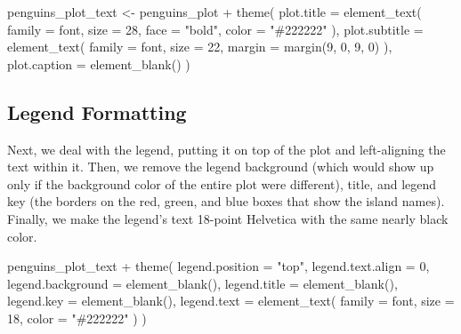 \documentclass[
]{book}
\newenvironment{Shaded}{\begin{snugshade}}{\end{snugshade}}
\newcommand{\AttributeTok}[1]{\textcolor[rgb]{0.77,0.63,0.00}{#1}}
\newcommand{\DecValTok}[1]{\textcolor[rgb]{0.00,0.00,0.81}{#1}}
\newcommand{\FunctionTok}[1]{\textcolor[rgb]{0.00,0.00,0.00}{#1}}
\newcommand{\NormalTok}[1]{#1}
\newcommand{\OtherTok}[1]{\textcolor[rgb]{0.56,0.35,0.01}{#1}}
\newcommand{\SpecialCharTok}[1]{\textcolor[rgb]{0.00,0.00,0.00}{#1}}
\newcommand{\StringTok}[1]{\textcolor[rgb]{0.31,0.60,0.02}{#1}}
\begin{document}
\begin{Shaded}
\begin{Highlighting}[]
\NormalTok{penguins\_plot\_text }\OtherTok{\textless{}{-}}\NormalTok{ penguins\_plot }\SpecialCharTok{+}
  \FunctionTok{theme}\NormalTok{(}
    \AttributeTok{plot.title =} \FunctionTok{element\_text}\NormalTok{(}
      \AttributeTok{family =}\NormalTok{ font,}
      \AttributeTok{size =} \DecValTok{28}\NormalTok{,}
      \AttributeTok{face =} \StringTok{"bold"}\NormalTok{,}
      \AttributeTok{color =} \StringTok{"\#222222"}
\NormalTok{    ),}
    \AttributeTok{plot.subtitle =} \FunctionTok{element\_text}\NormalTok{(}
      \AttributeTok{family =}\NormalTok{ font,}
      \AttributeTok{size =} \DecValTok{22}\NormalTok{,}
      \AttributeTok{margin =} \FunctionTok{margin}\NormalTok{(}\DecValTok{9}\NormalTok{, }\DecValTok{0}\NormalTok{, }\DecValTok{9}\NormalTok{, }\DecValTok{0}\NormalTok{)}
\NormalTok{    ),}
    \AttributeTok{plot.caption =} \FunctionTok{element\_blank}\NormalTok{()}
\NormalTok{  )}
\end{Highlighting}
\end{Shaded}

\hypertarget{legend-formatting}{%
\subsection*{Legend Formatting}\label{legend-formatting}}

Next, we deal with the legend, putting it on top of the plot and left-aligning the text within it. Then, we remove the legend background (which would show up only if the background color of the entire plot were different), title, and legend key (the borders on the red, green, and blue boxes that show the island names). Finally, we make the legend's text 18-point Helvetica with the same nearly black color.

\begin{Shaded}
\begin{Highlighting}[]
\NormalTok{penguins\_plot\_text }\SpecialCharTok{+}
  \FunctionTok{theme}\NormalTok{(}
    \AttributeTok{legend.position =} \StringTok{"top"}\NormalTok{,}
    \AttributeTok{legend.text.align =} \DecValTok{0}\NormalTok{,}
    \AttributeTok{legend.background =} \FunctionTok{element\_blank}\NormalTok{(),}
    \AttributeTok{legend.title =} \FunctionTok{element\_blank}\NormalTok{(),}
    \AttributeTok{legend.key =} \FunctionTok{element\_blank}\NormalTok{(),}
    \AttributeTok{legend.text =} \FunctionTok{element\_text}\NormalTok{(}
      \AttributeTok{family =}\NormalTok{ font,}
      \AttributeTok{size =} \DecValTok{18}\NormalTok{,}
      \AttributeTok{color =} \StringTok{"\#222222"}
\NormalTok{    )}
\NormalTok{  )}
\end{Highlighting}
\end{Shaded}
\end{document}
